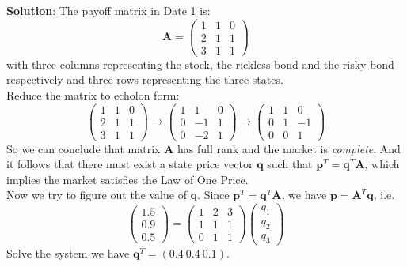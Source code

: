 \documentclass{article}
\begin{document}
\begin{enumerate}
    \textbf{Solution}: The payoff matrix in Date 1 is:
    $$ \mathbf{A} = \begin{pmatrix}1 &1 &0 \\ 2 &1 &1 \\ 3 &1 &1 \end{pmatrix} $$
    with three columns representing the stock, the rickless bond and the risky bond respectively and three rows representing the three states. \\
    
    Reduce the matrix to echolon form:
    $$ \begin{pmatrix}1 &1 &0 \\ 2 &1 &1 \\ 3 &1 &1 \end{pmatrix} \rightarrow 
    \begin{pmatrix}1 &1 &0 \\ 0 &-1 &1 \\ 0 &-2 &1 \end{pmatrix} \rightarrow 
    \begin{pmatrix}1 &1 &0 \\ 0 &1 &-1 \\ 0 &0 &1 \end{pmatrix} $$
    So we can conclude that matrix $\mathbf{A}$ has full rank and the market is \textit{complete}. 
    And it follows that there must exist a state price vector $\mathbf{q}$ such that $\mathbf{p}^T = \mathbf{q}^T\mathbf{A}$, which implies the market satisfies the Law of One Price. \\
    
    Now we try to figure out the value of $\mathbf{q}$. Since $\mathbf{p}^T = \mathbf{q}^T\mathbf{A}$, we have $\mathbf{p} = \mathbf{A}^T \mathbf{q}$, i.e.
    $$ \begin{pmatrix}1.5\\0.9\\0.5\end{pmatrix} = \begin{pmatrix}1 &2 &3\\1 &1 &1\\0 &1 &1\end{pmatrix} \begin{pmatrix}q_1\\q_2\\q_3\end{pmatrix}$$
    Solve the system we have $\mathbf{q}^T = (0.4\ 0.4\ 0.1)$.\\
    

\end{enumerate}
\end{document}
